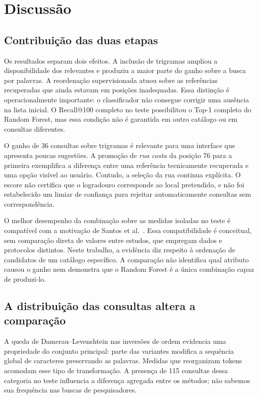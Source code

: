 \section{Discussão}

\subsection{Contribuição das duas etapas}

Os resultados separam dois efeitos. A inclusão de trigramas ampliou a disponibilidade dos relevantes e produziu a maior parte do ganho sobre a busca por palavras. A reordenação supervisionada atuou sobre as referências recuperadas que ainda estavam em posições inadequadas. Essa distinção é operacionalmente importante: o classificador não consegue corrigir uma ausência na lista inicial. O Recall@100 completo no teste possibilitou o Top-1 completo do Random Forest, mas essa condição não é garantida em outro catálogo ou em consultas diferentes.

O ganho de 36 consultas sobre trigramas é relevante para uma interface que apresenta poucas sugestões. A promoção de \emph{rua costa} da posição 76 para a primeira exemplifica a diferença entre uma referência tecnicamente recuperada e uma opção visível ao usuário. Contudo, a seleção da rua continua explícita. O escore não certifica que o logradouro corresponde ao local pretendido, e não foi estabelecido um limiar de confiança para rejeitar automaticamente consultas sem correspondência.

O melhor desempenho da combinação sobre as medidas isoladas no teste é compatível com a motivação de Santos et al.~\cite{santos2018}. Essa compatibilidade é conceitual, sem comparação direta de valores entre estudos, que empregam dados e protocolos distintos. Neste trabalho, a evidência diz respeito à ordenação de candidatos de um catálogo específico. A comparação não identifica qual atributo causou o ganho nem demonstra que o Random Forest é a única combinação capaz de produzi-lo.

\subsection{A distribuição das consultas altera a comparação}

A queda de Damerau--Levenshtein nas inversões de ordem evidencia uma propriedade do conjunto principal: parte das variantes modifica a sequência global de caracteres preservando as palavras. Medidas que reorganizam tokens acomodam esse tipo de transformação. A presença de 115 consultas dessa categoria no teste influencia a diferença agregada entre os métodos; não sabemos sua frequência nas buscas de pesquisadores.

